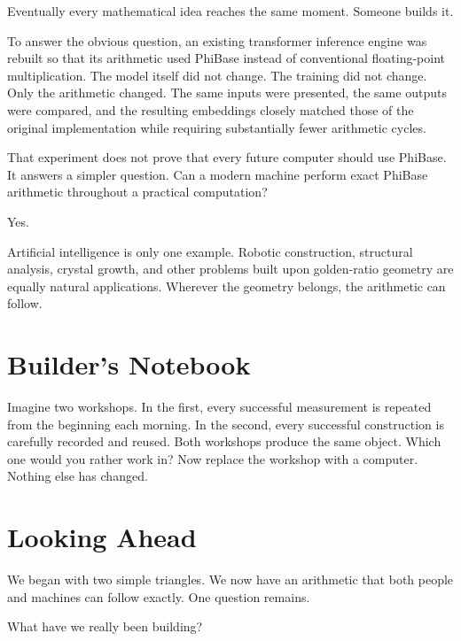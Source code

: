 Eventually every mathematical idea reaches the same moment. Someone builds it.

To answer the obvious question, an existing transformer inference engine was rebuilt so that its arithmetic used PhiBase instead of conventional floating-point multiplication. The model itself did not change. The training did not change. Only the arithmetic changed. The same inputs were presented, the same outputs were compared, and the resulting embeddings closely matched those of the original implementation while requiring substantially fewer arithmetic cycles.

That experiment does not prove that every future computer should use PhiBase. It answers a simpler question. Can a modern machine perform exact PhiBase arithmetic throughout a practical computation?

Yes.

Artificial intelligence is only one example. Robotic construction, structural analysis, crystal growth, and other problems built upon golden-ratio geometry are equally natural applications. Wherever the geometry belongs, the arithmetic can follow.

\section*{Builder's Notebook}

Imagine two workshops. In the first, every successful measurement is repeated from the beginning each morning. In the second, every successful construction is carefully recorded and reused. Both workshops produce the same object. Which one would you rather work in? Now replace the workshop with a computer. Nothing else has changed.

\section*{Looking Ahead}

We began with two simple triangles. We now have an arithmetic that both people and machines can follow exactly. One question remains.

What have we really been building?
